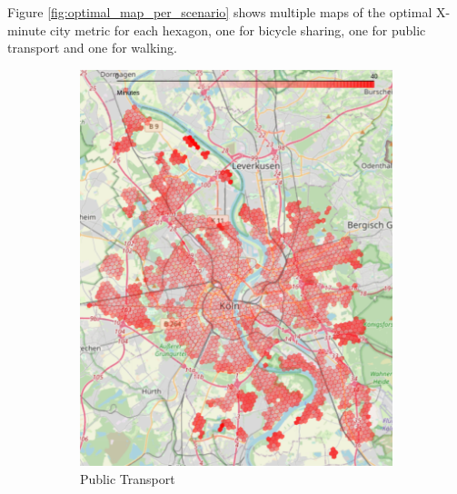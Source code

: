 Figure \ref{fig:optimal_map_per_scenario} shows multiple maps of the optimal X-minute city metric for each hexagon, one for bicycle sharing, one for public transport and one for walking.
\begin{figure}
     \centering
     \begin{subfigure}[b]{0.3\textwidth}
         \centering
         \includegraphics[width=\textwidth]{Figures/results/minute_city_metric/public_transport_optimal_map}
         \caption{Public Transport}
         \label{fig:public_transport_optimal_map}
     \end{subfigure}
     \hfill
     \begin{subfigure}[b]{0.3\textwidth}
         \centering

\end{subfigure}
\end{figure}
